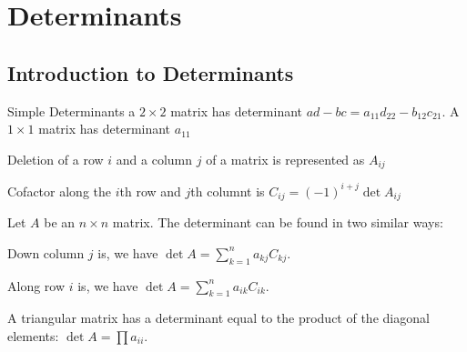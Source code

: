 \section{Determinants}\label{ch-dets}
\begin{outline}
\end{outline}

\begin{card}
    \subsection{Introduction to Determinants}

    \begin{compactdesc}
    \item[Simple Determinants] a $2 \times 2$ matrix has determinant
        $ad - bc = a_{11}d_{22} - b_{12}c_{21}$.
        A $1 \times 1$ matrix has determinant $a_{11}$
    \item[Deletion] of a row $i$ and a column $j$ of a matrix
        is represented as $A_{ij}$
    \item[Cofactor] along the $i$th row and $j$th columnt is
        $C_{ij} = (-1)^{i + j} \det A_{ij}$
    \end{compactdesc}

    \begin{theorem}
        Let $A$ be an $n\times n$ matrix. The determinant can be found in
        two similar ways:

        Down column $j$ is, we have $\det A = \sum_{k=1}^n a_{kj} C_{kj}$.

        Along row $i$ is, we have $\det A = \sum_{k=1}^n a_{ik} C_{ik}$.
    \end{theorem}

    \begin{theorem}
    A triangular matrix has a determinant equal to the product of the
        diagonal elements: $\det A = \prod a_{ii}$.
    \end{theorem}
\end{card}


